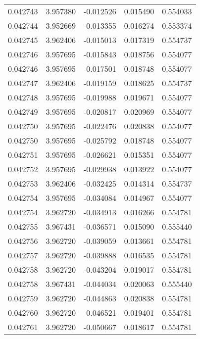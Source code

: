 \begin{tabular}{lrrrr}
0.042743    &  3.957380 & -0.012526 &  0.015490 &             0.554033 \\
0.042744    &  3.952669 & -0.013355 &  0.016274 &             0.553374 \\
0.042745    &  3.962406 & -0.015013 &  0.017319 &             0.554737 \\
0.042746    &  3.957695 & -0.015843 &  0.018756 &             0.554077 \\
0.042746    &  3.957695 & -0.017501 &  0.018748 &             0.554077 \\
0.042747    &  3.962406 & -0.019159 &  0.018625 &             0.554737 \\
0.042748    &  3.957695 & -0.019988 &  0.019671 &             0.554077 \\
0.042749    &  3.957695 & -0.020817 &  0.020969 &             0.554077 \\
0.042750    &  3.957695 & -0.022476 &  0.020838 &             0.554077 \\
0.042750    &  3.957695 & -0.025792 &  0.018748 &             0.554077 \\
0.042751    &  3.957695 & -0.026621 &  0.015351 &             0.554077 \\
0.042752    &  3.957695 & -0.029938 &  0.013922 &             0.554077 \\
0.042753    &  3.962406 & -0.032425 &  0.014314 &             0.554737 \\
0.042754    &  3.957695 & -0.034084 &  0.014967 &             0.554077 \\
0.042754    &  3.962720 & -0.034913 &  0.016266 &             0.554781 \\
0.042755    &  3.967431 & -0.036571 &  0.015090 &             0.555440 \\
0.042756    &  3.962720 & -0.039059 &  0.013661 &             0.554781 \\
0.042757    &  3.962720 & -0.039888 &  0.016535 &             0.554781 \\
0.042758    &  3.962720 & -0.043204 &  0.019017 &             0.554781 \\
0.042758    &  3.967431 & -0.044034 &  0.020063 &             0.555440 \\
0.042759    &  3.962720 & -0.044863 &  0.020838 &             0.554781 \\
0.042760    &  3.962720 & -0.046521 &  0.019401 &             0.554781 \\
0.042761    &  3.962720 & -0.050667 &  0.018617 &             0.554781 \\

\end{tabular}
